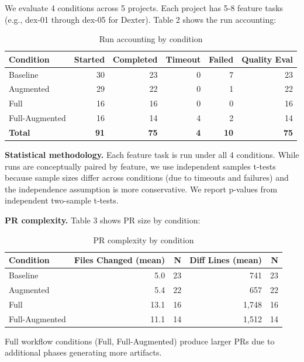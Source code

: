 \documentclass[sigconf,anonymous,review]{acmart}
\begin{document}
We evaluate 4 conditions across 5 projects. Each project has 5-8 feature tasks (e.g., dex-01 through dex-05 for Dexter). Table 2 shows the run accounting:

\begin{table}[ht]
  \centering
  \caption{Run accounting by condition}
  \label{tab:run-counts}
  \begin{tabular}{lrrrrr}
    \hline
    \textbf{Condition} & \textbf{Started} & \textbf{Completed} & \textbf{Timeout} & \textbf{Failed} & \textbf{Quality Eval} \\
    \hline
    Baseline & 30 & 23 & 0 & 7 & 23 \\
    Augmented & 29 & 22 & 0 & 1 & 22 \\
    Full & 16 & 16 & 0 & 0 & 16 \\
    Full-Augmented & 16 & 14 & 4 & 2 & 14 \\
    \hline
    \textbf{Total} & \textbf{91} & \textbf{75} & \textbf{4} & \textbf{10} & \textbf{75} \\
  \end{tabular}
\end{table}

\textbf{Statistical methodology.} Each feature task is run under all 4 conditions. While runs are conceptually paired by feature, we use independent samples t-tests because sample sizes differ across conditions (due to timeouts and failures) and the independence assumption is more conservative. We report p-values from independent two-sample t-tests.

\textbf{PR complexity.} Table 3 shows PR size by condition:

\begin{table}[ht]
  \centering
  \caption{PR complexity by condition}
  \label{tab:pr-complexity}
  \begin{tabular}{lrrrr}
    \hline
    \textbf{Condition} & \textbf{Files Changed (mean)} & \textbf{N} & \textbf{Diff Lines (mean)} & \textbf{N} \\
    \hline
    Baseline & 5.0 & 23 & 741 & 23 \\
    Augmented & 5.4 & 22 & 657 & 22 \\
    Full & 13.1 & 16 & 1,748 & 16 \\
    Full-Augmented & 11.1 & 14 & 1,512 & 14 \\
    \hline
  \end{tabular}
\end{table}

Full workflow conditions (Full, Full-Augmented) produce larger PRs due to additional phases generating more artifacts.
\end{document}
